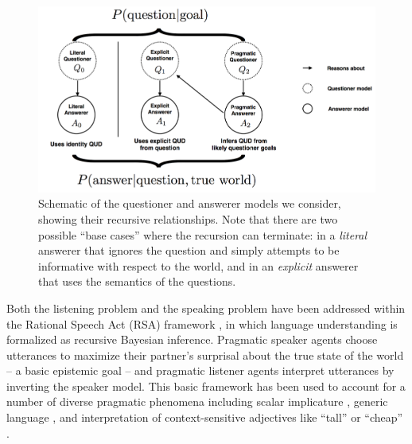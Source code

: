 \documentclass[12pt, floatsintext, jou]{apa6}
\begin{document}
\begin{figure}[t]
\begin{center}
\includegraphics[scale = .5]{models.png}
\end{center}
\caption{Schematic of the questioner and answerer models we consider, showing their recursive relationships. Note that there are two possible ``base cases'' where the recursion can terminate: in a \emph{literal} answerer that ignores the question and simply attempts to be informative with respect to the world, and in an \emph{explicit} answerer that uses the semantics of the questions.}
\label{fig:models}
\end{figure}

Both the listening problem and the speaking problem have been addressed within the Rational Speech Act (RSA) framework \cite{FrankGoodman12_PragmaticReasoningLanguageGames, GoodmanStuhlmuller13_KnowledgeImplicature, GoodmanFrank16_RSATiCS}, in which language understanding is formalized as recursive Bayesian inference. Pragmatic speaker agents choose utterances to maximize their partner's surprisal about the true state of the world -- a basic epistemic goal -- and pragmatic listener agents interpret utterances by inverting the speaker model. This basic framework has been used to account for a number of diverse pragmatic phenomena including 
scalar implicature \cite{GoodmanStuhlmuller13_KnowledgeImplicature}, %
generic language \cite{TesslerGoodman16_Generics}, and
interpretation of context-sensitive adjectives like ``tall'' or ``cheap'' \cite{LassiterGoodman15_AdjectivalVagueness}.
\end{document}
